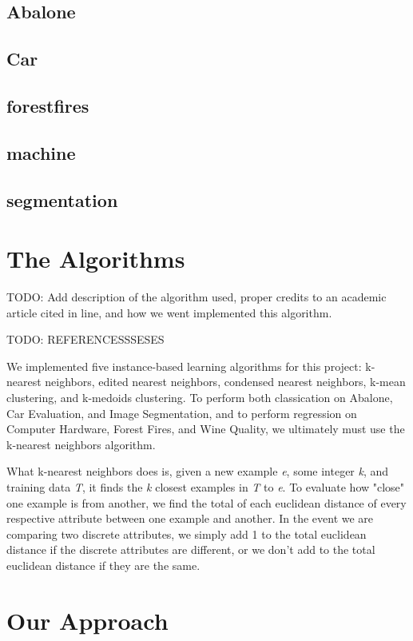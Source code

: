\documentclass[twoside,11pt]{article}
\begin{document}
\subsection{Abalone}

\subsection{Car}

\subsection{forestfires}

\subsection{machine}

\subsection{segmentation}

\section{The Algorithms}
TODO: Add description of the algorithm used, proper credits to an academic article cited in line, and how we went implemented this algorithm.

TODO: REFERENCESSSESES

We implemented five instance-based learning algorithms for this project: k-nearest neighbors, edited nearest neighbors, condensed nearest neighbors, k-mean clustering, and k-medoids clustering. To perform both classication on Abalone, Car Evaluation, and Image Segmentation, and to perform regression on Computer Hardware, Forest Fires, and Wine Quality, we ultimately must use the k-nearest neighbors algorithm. 

What k-nearest neighbors does is, given a new example \emph{e}, some integer \emph{k}, and training data \emph{T}, it finds the \emph{k} closest examples in \emph{T} to \emph{e}. To evaluate how "close" one example is from another, we find the total of each euclidean distance of every respective attribute between one example and another. In the event we are comparing two discrete attributes, we simply add 1 to the total euclidean distance if the discrete attributes are different, or we don't add to the total euclidean distance if they are the same.


\section{Our Approach}
\end{document}
